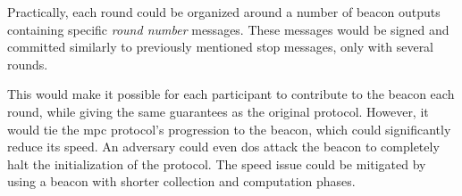 Practically, each round could be organized around a number of beacon outputs containing specific \textit{round number} messages.
These messages would be signed and committed similarly to previously mentioned stop messages, only with several rounds.

This would make it possible for each participant to contribute to the beacon each round, while giving the same guarantees as the original protocol.
However, it would tie the \acrshort{mpc} protocol's progression to the beacon, which could significantly reduce its speed.
An adversary could even \acrshort{dos} attack the beacon to completely halt the initialization of the protocol.
The speed issue could be mitigated by using a beacon with shorter collection and computation phases.

